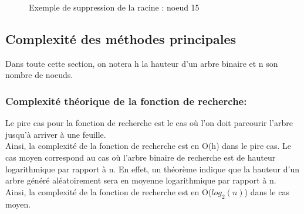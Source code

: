 \documentclass{report}
\begin{document}
\begin{figure}[h]
\centering
\begin{subfigure}[b]{.3\textwidth}
\end{subfigure}
\begin{subfigure}[b]{.3\textwidth}
\end{subfigure}
\begin{subfigure}[b]{.3\textwidth}
\end{subfigure}
\caption{Exemple de suppression de la racine : noeud 15}
\end{figure}
\subsection{Complexité des méthodes principales}
Dans toute cette section, on notera h la hauteur d'un arbre binaire et n son nombre de noeuds.
\subsubsection{Complexité théorique de la fonction de recherche:}
Le pire cas pour la fonction de recherche est le cas où l'on doit parcourir l'arbre jusqu'à arriver à une feuille. \\
Ainsi, la complexité de la fonction de recherche est en O(h) dans le pire cas. \newline \newline
Le cas moyen correspond au cas où l'arbre binaire de recherche est de hauteur logarithmique par rapport à n. En effet, un théorème indique que la hauteur d'un arbre généré aléatoirement sera en moyenne logarithmique par rapport à n. \cite{hauteur} \\
Ainsi, la complexité de la fonction de recherche est en O($log_2(n)$) dans le cas moyen.
\end{document}
